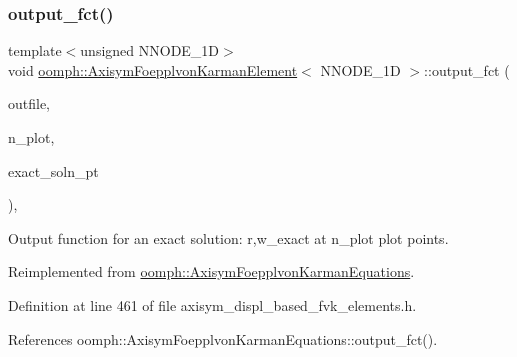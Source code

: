 \mbox{\label{classoomph_1_1AxisymFoepplvonKarmanElement_aee745c3439aa18c82ddbe8b90fade1c0}} 
\subsubsection{\texorpdfstring{output\+\_\+fct()}{output\_fct()}\hspace{0.1cm}{\footnotesize\ttfamily [3/4]}}
{\footnotesize\ttfamily template$<$unsigned N\+N\+O\+D\+E\+\_\+1D$>$ \\
void \hyperlink{classoomph_1_1AxisymFoepplvonKarmanElement}{oomph\+::\+Axisym\+Foepplvon\+Karman\+Element}$<$ N\+N\+O\+D\+E\+\_\+1D $>$\+::output\+\_\+fct (\begin{DoxyParamCaption}\item[{std\+::ostream \&}]{outfile,  }\item[{const unsigned \&}]{n\+\_\+plot,  }\item[{\hyperlink{classoomph_1_1FiniteElement_a690fd33af26cc3e84f39bba6d5a85202}{Finite\+Element\+::\+Steady\+Exact\+Solution\+Fct\+Pt}}]{exact\+\_\+soln\+\_\+pt }\end{DoxyParamCaption})\hspace{0.3cm}{\ttfamily [inline]}, {\ttfamily [virtual]}}



Output function for an exact solution\+: r,w\+\_\+exact at n\+\_\+plot plot points. 



Reimplemented from \hyperlink{classoomph_1_1AxisymFoepplvonKarmanEquations_aae7ed0c9ae0e1a1e2656534807a24527}{oomph\+::\+Axisym\+Foepplvon\+Karman\+Equations}.



Definition at line 461 of file axisym\+\_\+displ\+\_\+based\+\_\+fvk\+\_\+elements.\+h.



References oomph\+::\+Axisym\+Foepplvon\+Karman\+Equations\+::output\+\_\+fct().

\mbox{\label{classoomph_1_1AxisymFoepplvonKarmanElement_a290c4391d1da3688805466cf2852a93e}} 
